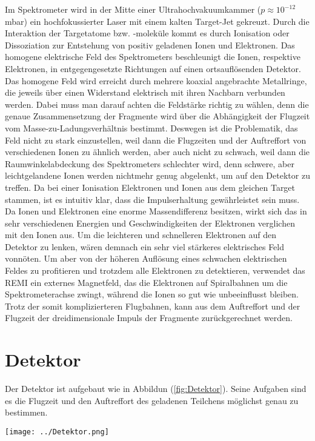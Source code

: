 Im Spektrometer wird in der Mitte einer Ultrahochvakuumkammer ($p \approx 10^{-12}$mbar) ein hochfokussierter Laser mit einem kalten Target-Jet gekreuzt. Durch die Interaktion der Targetatome bzw. -moleküle kommt es durch Ionisation oder Dissoziation zur Entstehung von positiv geladenen Ionen und Elektronen. Das homogene elektrische Feld des Spektrometers beschleunigt die Ionen, respektive Elektronen, in entgegengesetzte Richtungen auf einen ortsauflösenden Detektor. Das homogene Feld wird erreicht durch mehrere koaxial angebrachte Metallringe, die jeweils über einen Widerstand elektrisch mit ihren Nachbarn verbunden werden. Dabei muss man darauf achten die Feldstärke richtig zu wählen, denn die genaue Zusammensetzung der Fragmente wird über die Abhängigkeit der Flugzeit vom Masse-zu-Ladungsverhältnis bestimmt. Deswegen ist die Problematik, das Feld nicht zu stark einzustellen, weil dann die Flugzeiten und der Auftreffort von verschiedenen Ionen zu ähnlich werden, aber auch nicht zu schwach, weil dann die Raumwinkelabdeckung des Spektrometers schlechter wird, denn schwere, aber leichtgelandene Ionen werden nichtmehr genug abgelenkt, um auf den Detektor zu treffen.
Da bei einer Ionisation Elektronen und Ionen aus dem gleichen Target stammen, ist es intuitiv klar, dass die Impulserhaltung gewährleistet sein muss. Da Ionen und Elektronen eine enorme Massendifferenz besitzen, wirkt sich das in sehr verschiedenen Energien und Geschwindigkeiten der Elektronen verglichen mit den Ionen aus. Um die leichteren und schnelleren Elektronen auf den Detektor zu lenken, wären demnach ein sehr viel stärkeres elektrisches Feld vonnöten. Um aber von der höheren Auflösung eines schwachen elektrischen Feldes zu profitieren und trotzdem alle Elektronen zu detektieren, verwendet das REMI ein externes Magnetfeld, das die Elektronen auf Spiralbahnen um die Spektrometerachse zwingt, während die Ionen so gut wie unbeeinflusst bleiben. Trotz der somit komplizierteren Flugbahnen, kann aus dem Auftreffort und der Flugzeit der dreidimensionale Impuls der Fragmente zurückgerechnet werden. 

\section{Detektor}

Der Detektor ist aufgebaut wie in Abbildun (\ref{fig:Detektor}). Seine Aufgaben sind es die Flugzeit und den Auftreffort des geladenen Teilchens möglichst genau zu bestimmen. 

\begin{center}
\begin{minipage}{\linewidth}
\centering
\texttt{[image: ../Detektor.png]}%
 \label{fig:Detektor}
\end{minipage} 
\end{center} 

